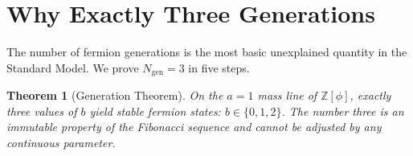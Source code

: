 \documentclass[12pt,a4paper]{article}
\newtheorem{theorem}{Theorem}
\theoremstyle{definition}
\begin{document}
\section{Why Exactly Three Generations}
\label{sec:generations}

The number of fermion generations is the most basic unexplained quantity in the Standard Model. We prove $N_{\text{gen}} = 3$ in five steps.

\begin{theorem}[Generation Theorem]
On the $a = 1$ mass line of $\mathbb{Z}[\phi]$, exactly three values of $b$ yield stable fermion states: $b \in \{0, 1, 2\}$. The number three is an immutable property of the Fibonacci sequence and cannot be adjusted by any continuous parameter.
\end{theorem}
\end{document}
